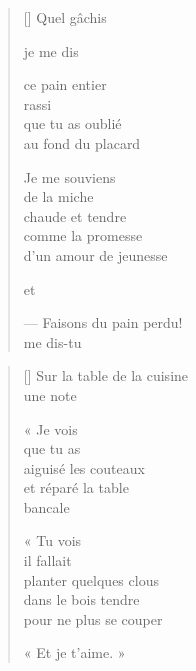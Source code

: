 \documentclass[11pt,a4paper]{book}
\begin{document}
\begin{verse}[\versewidth]
  Quel gâchis

  je me dis

  ce pain entier \\
  rassi \\
  que tu as oublié \\
  au fond du placard

  Je me souviens \\
  de la miche \\
  chaude et tendre \\
  comme la promesse \\
  d'un amour de jeunesse

  et

  --- Faisons du pain perdu! \\
  me dis-tu
\end{verse}

\newpage


\settowidth{\versewidth}{planter quelques clous}

\bigskip

\begin{verse}[\versewidth]
  Sur la table de la cuisine \\
  une note

  « Je vois \\
  que tu as \\
  aiguisé les couteaux \\
  et réparé la table \\
  bancale

  « Tu vois \\
  il fallait \\
  planter quelques clous \\
  dans le bois tendre \\
  pour ne plus se couper

  « Et je t'aime. »

\end{verse}

\newpage


\settowidth{\versewidth}{même au bout d'un fusil}

\bigskip
\end{document}
